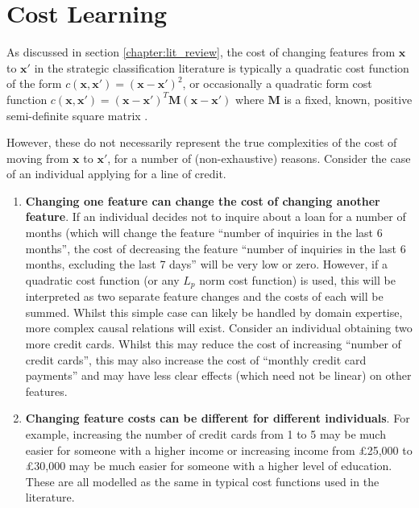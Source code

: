 \chapter{Cost Learning}



As discussed in section \ref{chapter:lit_review}, the cost of changing features from $\mathbf{x}$ to $\mathbf{x}'$ in the strategic classification literature is typically a quadratic cost function of the form $c(\mathbf{x}, \mathbf{x}') = (\mathbf{x} - \mathbf{x}')^2$, or occasionally a quadratic form cost function $c(\mathbf{x}, \mathbf{x}') = (\mathbf{x-x'})^T\mathbf{M}(\mathbf{x-x'})$ where $\mathbf{M}$ is a fixed, known, positive semi-definite square matrix \citep{bechavodInformationDiscrepancyStrategic2022}.

However, these do not necessarily represent the true complexities of the cost of moving from $\mathbf{x}$ to $\mathbf{x}'$, for a number of (non-exhaustive) reasons. Consider the case of an individual applying for a line of credit.

\begin{enumerate}
	\item \textbf{Changing one feature can change the cost of changing another feature}. If an individual decides not to inquire about a loan for a number of months (which will change the feature ``number of inquiries in the last 6 months'', the cost of decreasing the feature ``number of inquiries in the last 6 months, excluding the last 7 days'' will be very low or zero. However, if a quadratic cost function (or any $L_p$ norm cost function) is used, this will be interpreted as two separate feature changes and the costs of each will be summed. Whilst this simple case can likely be handled by domain expertise, more complex causal relations will exist. Consider an individual obtaining two more credit cards. Whilst this may reduce the cost of increasing ``number of credit cards'', this may also increase the cost of ``monthly credit card payments'' and may have less clear effects (which need not be linear) on other features.
	
	\item \textbf{Changing feature costs can be different for different individuals}. For example, increasing the number of credit cards from 1 to 5 may be much easier for someone with a higher income or increasing income from £25,000 to £30,000 may be much easier for someone with a higher level of education. These are all modelled as the same in typical cost functions used in the literature. 
\end{enumerate}

